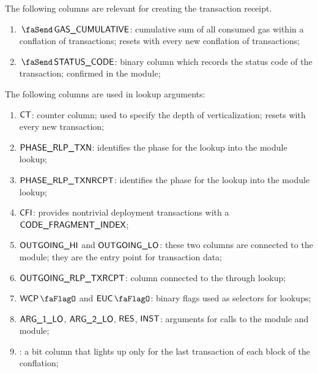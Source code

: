 The following columns are relevant for creating the transaction receipt.
\begin{enumerate}[resume]
	\item $\txCumulativeConsumedGas$:
		\markAsComputedHere{}
		cumulative sum of all consumed gas within a conflation of transactions; resets with every new conflation of transactions; 
	\item $\txStatusCode$:
		\markAsExtractedFromHub{}
		\godGiven{}
		binary column which records the status code of the transaction; confirmed in the \hubMod{} module;
\end{enumerate}
The following columns are used in lookup arguments: 
\begin{enumerate}[resume]
	\item $\textsf{CT}$:
		counter column; used to specify the depth of verticalization; resets with every new transaction; 
	\item $\textsf{PHASE\_RLP\_TXN}$:
		identifies the phase for the lookup into the \rlpTxnMod{} module lookup;
	\item $\textsf{PHASE\_RLP\_TXNRCPT}$:
		identifies the phase for the lookup into the \rlpTxnRcptMod{} module lookup;
	\item $\textsf{CFI}$:
		provides nontrivial deployment transactions with a $\textsf{CODE\_FRAGMENT\_INDEX}$; 
	\item $\textsf{OUTGOING}\textsf{\_HI}$ and $\textsf{OUTGOING}\textsf{\_LO}$:
		these two columns are connected to the \rlpTxnMod{} module; they are the entry point for transaction data;
	\item $\textsf{OUTGOING\_RLP\_TXRCPT}$:
		column connected to the \rlpTxnRcptMod{} through lookup;
	\item $\wcpFlag$ and $\eucFlag$:
		binary flags used as selectors for lookups;
	\item $\textsf{ARG}\textsf{\_1}\textsf{\_LO}$, $\textsf{ARG}\textsf{\_2}\textsf{\_LO}$, $\textsf{RES}$, $\textsf{INST}$:
		arguments for calls to the \wcpMod{} module and \eucMod{} module;
	\item \isLastTxOfBlock{}:
		a bit column that lights up only for the last transaction of each block of the conflation;
\end{enumerate}

